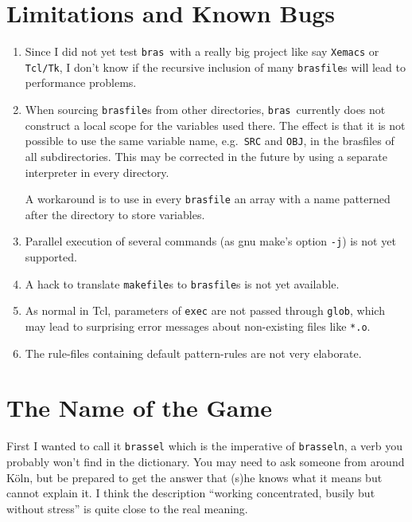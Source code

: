 \documentclass[12pt]{article}
\newcommand{\bras}{\texttt{bras}}
\begin{document}
\section{Limitations and Known Bugs}


\begin{enumerate}
\item
Since I did not yet test \bras\ with a really big project like say
\texttt{Xemacs} or \texttt{Tcl/Tk}, I don't know if the recursive
inclusion of many \texttt{brasfile}s will lead to performance
problems.

\item
When sourcing \texttt{brasfile}s from other directories, \bras\
currently does not construct a local scope for the variables used
there. The effect is that it is not possible to use the same variable
name, e.g.\ \texttt{SRC} and \texttt{OBJ}, in the brasfiles
of all subdirectories. This may be corrected in the future by using a
separate interpreter in every directory.

A workaround is to use in every \texttt{brasfile} an array with a name
patterned after the directory to store variables.

\item 
Parallel execution of several commands (as gnu make's option
\texttt{-j}) is not yet supported.

\item
A hack to translate \texttt{makefile}s to \texttt{brasfile}s is not
yet available.

\item
As normal in Tcl, parameters of \texttt{exec} are not passed through
\texttt{glob}, which may lead to surprising error messages about
non-existing files like \texttt{*.o}.

\item
The rule-files containing default pattern-rules are not very
elaborate.

\end{enumerate}

\section{The Name of the Game}

First I wanted to call it \texttt{brassel} which is the imperative of
\texttt{brasseln}, a verb you probably won't find in the
dictionary. You may need to ask someone from around K\"oln, but be
prepared to get the answer that (s)he knows what it means but cannot
explain it. I think the description "`working concentrated, busily but
without stress"' is quite close to the real meaning.
\end{document}
